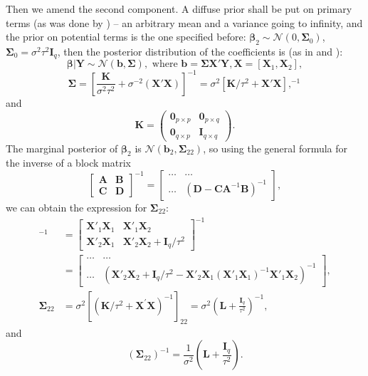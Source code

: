 Then we amend the second component. A diffuse prior shall be put on primary terms (as was done by \cite{DuMouchel1994}) -- an arbitrary mean and a variance going to infinity, and the prior on potential terms is the one specified before: $\bm{\beta}_2\sim\mathcal{N}(0,\bm{\Sigma}_{0})$,
$\bm{\Sigma}_{0}=\sigma^{2}\tau^{2}\bm{I}_{q}$, then the posterior
distribution of the coefficients is (as in \cite{Koch2007introduction} and \cite{DuMouchel1994}):
$$\bm{\beta}|\bm{Y}\sim \mathcal{N}(\bm{b},\bm{\Sigma}),\mbox{ where }\bm{b}=\bm{\Sigma X}'\bm{Y}, \bm{X}=[\bm{X}_1, \bm{X}_2],$$
$$\bm{\Sigma}=\left[\frac{\bm{K}}{\sigma^{2}\tau^{2}}+\sigma^{-2}(\bm{X'X})\right]^{-1}=\sigma^{2}[\bm{K}/\tau^{2}+\bm{X'}\bm{X}],^{-1}$$
and 
\begin{equation*}
\bm{K}=\begin{pmatrix}
\bm{0}_{p\times p} & \bm{0}_{p\times q}\\
\bm{0}_{q\times p} & \bm{I}_{q\times q}
\end{pmatrix}.
\end{equation*}
The marginal posterior of $\bm{\beta}_2$ is $\mathcal{N}(\bm{b}_{2},\bm{\Sigma}_{22})$, so using the general formula for the inverse of a block matrix
$$\begin{bmatrix}
 \bm{A}& \bm{B}\\
 \bm{C}& \bm{D}
\end{bmatrix}^{-1}=\begin{bmatrix}
\ldots & \ldots\\
\ldots & (\bm{D}-\bm{CA}^{-1}\bm{B})^{-1}
\end{bmatrix},$$
we can obtain the expression for $\bm{\Sigma}_{22}$:
\begin{align*}
[\bm{K}/\tau^{2}+\bm{X}'\bm{X}]^{-1}&=\begin{bmatrix}
 \bm{X}'_1\bm{X}_1& \bm{X}'_1\bm{X}_2 \\
 \bm{X}'_2\bm{X}_1& \bm{X}'_2\bm{X}_2+\bm{I}_{q}/\tau^{2}
\end{bmatrix}^{-1}\\&=\begin{bmatrix}
\ldots & \ldots\\
\ldots &
(\bm{X}'_2\bm{X}_2+\bm{I}_{q}/\tau^{2}-\bm{X}'_2\bm{X}_1(\bm{X}'_1\bm{X}_1)^{-1}\bm{X}'_1\bm{X}_2)^{-1}
\end{bmatrix},\\
\bm{\Sigma}_{22}&=\sigma^{2}[(\bm{K}/\tau^{2}+\bm{X}^{'}\bm{X})^{-1}]_{22}=\sigma^{2}\left(\bm{L}+\frac{\bm{I}_{q}}{\tau^{2}}\right)^{-1},
\end{align*} 
and $$(\bm{\Sigma}_{22})^{-1}=\frac{1}{\sigma^{2}}\left(\bm{L}+\frac{\bm{I}_{q}}{\tau^{2}}\right).$$

